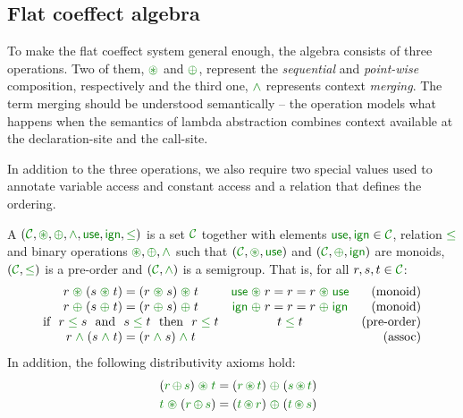 
\subsection{Flat coeffect algebra}
To make the flat coeffect system general enough, the algebra consists of three operations.
Two of them, $\cseq$ and $\cpar$, represent the \emph{sequential} and \emph{point-wise} composition, 
respectively and the third one, $\czip$ represents context \emph{merging}. The term merging should be 
understood semantically -- the operation models what happens when the semantics of lambda abstraction 
combines context available at the declaration-site and the call-site.

In addition to the three operations, we also require two special values used to annotate
variable access and constant access and a relation that defines the ordering.

\begin{definition}
A \emph{} $(\C, \cseq, \cpar, \czip, \cunit, \czero, \cleq)$ is a set 
$\C$ together with elements $\cunit, \czero \in \C$, relation $\cleq$ and binary operations 
$\cseq, \cpar, \czip$ such that $(\C, \cseq, \cunit)$ and $(\C, \cpar, \czero)$ are monoids,
$(\C, \cleq)$ is a pre-order and $(\C, \czip)$ is a semigroup. That is, for all $r,s,t\in \C$:
%
\begin{equation*}
\begin{array}{ccr}
r \;\cseq\; (s \;\cseq\; t) = (r \;\cseq\; s) \;\cseq\; t  &
\cunit \;\cseq\; r = r = r \;\cseq\; \cunit &
\textnormal{(monoid)}   
\\
r \;\cpar\; (s \;\cpar\; t) = (r \;\cpar\; s) \;\cpar\; t &
\czero \;\cpar\; r = r = r \;\cpar\; \czero &
\textnormal{(monoid)}   
\\
\textnormal{if}~~r\; \cleq\; s ~~\textnormal{and}~~s\; \cleq\; t~~\textnormal{then}~~r\; \cleq\; t&
t\; \cleq\; t &
\textnormal{(pre-order)}   
\\
r \;\czip\; (s \;\czip\; t) = (r \;\czip\; s) \;\czip\; t &&
\textnormal{(assoc)}   
\end{array}
\end{equation*}
%
In addition, the following distributivity axioms hold:
\begin{align*}
\quad (\cclrd{r}\, \cpar\, \cclrd{s}) \;\cseq\; \cclrd{t} & = (\cclrd{r} \,\cseq\, \cclrd{t}) \;\cpar\; (\cclrd{s}\, \cseq\, \cclrd{t}) \\
\quad \cclrd{t} \;\cseq\; (\cclrd{r}\, \cpar\, \cclrd{s}) & = (\cclrd{t} \,\cseq\, \cclrd{r}) \;\cpar\; (\cclrd{t}\, \cseq\, \cclrd{s})
\end{align*}
\end{definition}

